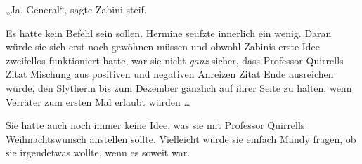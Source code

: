 „Ja, General“, sagte Zabini steif.

Es hatte kein Befehl sein sollen. Hermine seufzte innerlich ein wenig. Daran würde sie sich erst noch gewöhnen müssen und obwohl Zabinis erste Idee zweifellos funktioniert hatte, war sie nicht \emph{ganz} sicher, dass Professor Quirrells Zitat Mischung aus positiven und negativen Anreizen Zitat Ende ausreichen würde, den Slytherin bis zum Dezember gänzlich auf ihrer Seite zu halten, wenn Verräter zum ersten Mal erlaubt würden …

Sie hatte auch noch immer keine Idee, was sie mit Professor Quirrells Weihnachtswunsch anstellen sollte. Vielleicht würde sie einfach Mandy fragen, ob sie irgendetwas wollte, wenn es soweit war.

